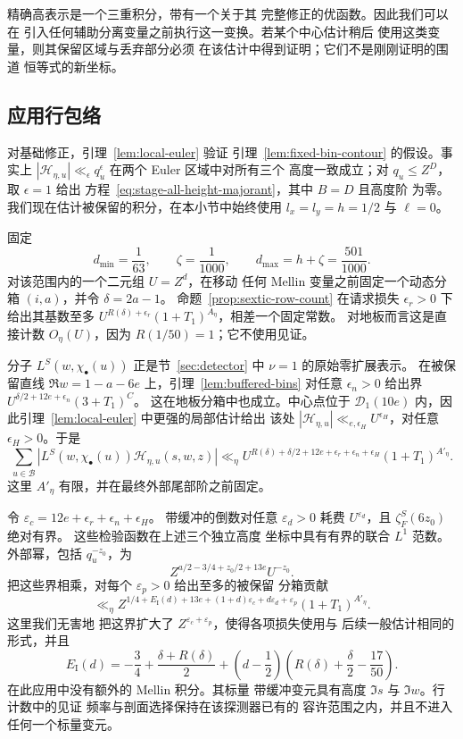 精确高表示是一个三重积分，带有一个关于其
完整修正的优函数。因此我们可以在
引入任何辅助分离变量之前执行这一变换。若某个中心估计稍后
使用这类变量，则其保留区域与丢弃部分必须
在该估计中得到证明；它们不是刚刚证明的围道
恒等式的新坐标。

\subsection{应用行包络}

对基础修正，引理~\ref{lem:local-euler} 验证
引理~\ref{lem:fixed-bin-contour} 的假设。事实上
$|\mathcal H_{\eta,u}|\ll_\epsilon q_u^\epsilon$ 在两个 Euler 区域中对所有三个
高度一致成立；对 $q_u\le Z^D$，取 $\epsilon=1$ 给出
方程~\eqref{eq:stage-all-height-majorant}，其中 $B=D$ 且高度阶
为零。我们现在估计被保留的积分，在本小节中始终使用
$l_x=l_y=h=1/2$ 与 $\ell=0$。

固定
\[
 d_{\min}=\frac1{63},\qquad \zeta=\frac1{1000},\qquad
 d_{\max}=h+\zeta=\frac{501}{1000}.
\]
对该范围内的一个二元组 $U=Z^d$，在移动
任何 Mellin 变量之前固定一个动态分箱 $(i,a)$，并令 $\delta=2a-1$。
命题~\ref{prop:sextic-row-count} 在请求损失
$\epsilon_r>0$ 下给出其基数至多
$U^{R(\delta)+\epsilon_r}(1+T_1)^{A_\eta}$，相差一个固定常数。
对地板而言这是直接计数 $O_\eta(U)$，因为
$R(1/50)=1$；它不使用见证。

分子 $L^S(w,\chi_\bullet(u))$ 正是节~\ref{sec:detector} 中
$\nu=1$ 的原始零扩展表示。
在被保留直线 $\Re w=1-a-6e$ 上，引理~\ref{lem:buffered-bins} 对任意
$\epsilon_n>0$ 给出界
$U^{\delta/2+12e+\epsilon_n}(3+T_1)^C$。
这在地板分箱中也成立。中心点位于
$\mathcal D_1(10e)$ 内，因此引理~\ref{lem:local-euler} 中更强的局部估计给出
该处 $|\mathcal H_{\eta,u}|\ll_{e,\epsilon_H}U^{\epsilon_H}$，对任意
$\epsilon_H>0$。于是
\[
 \sum_{u\in\mathcal B}
 |L^S(w,\chi_\bullet(u))\mathcal H_{\eta,u}(s,w,z)|
 \ll_\eta
 U^{R(\delta)+\delta/2+12e+\epsilon_r+\epsilon_n+\epsilon_H}
 (1+T_1)^{A'_\eta}.
\]
这里 $A'_\eta$ 有限，并在最终外部尾部阶之前固定。

令 $\varepsilon_c=12e+\epsilon_r+\epsilon_n+\epsilon_H$。
带缓冲的倒数对任意
$\varepsilon_d>0$ 耗费 $U^{\varepsilon_d}$，且 $\zeta_F^S(6z_0)$ 绝对有界。
这些检验函数在上述三个独立高度
坐标中具有有界的联合 $L^1$ 范数。外部幂，包括 $q_u^{-z_0}$，为
\[
 Z^{a/2-3/4+z_0/2+13e}U^{-z_0}.
\]
把这些界相乘，对每个 $\varepsilon_p>0$ 给出至多的被保留
分箱贡献
\begin{equation}
 \ll_\eta Z^{1/4+E_{\mathrm I}(d)+13e
       +(1+d)\varepsilon_c+d\varepsilon_d+\varepsilon_p}
 (1+T_1)^{A'_\eta}.
 \label{eq:balanced-central-contribution}
\end{equation}
这里我们无害地
把这界扩大了 $Z^{\varepsilon_c+\varepsilon_p}$，使得各项损失使用与
后续一般估计相同的形式，并且
\[
 E_{\mathrm I}(d)=-\frac34+\frac{\delta+R(\delta)}2
 +\left(d-\frac12\right)
       \left(R(\delta)+\frac\delta2-\frac{17}{50}\right).
\]
在此应用中没有额外的 Mellin 积分。其标量
带缓冲变元具有高度 $\Im s$ 与 $\Im w$。行计数中的见证
频率与剖面选择保持在该探测器已有的
容许范围之内，并且不进入任何一个标量变元。

